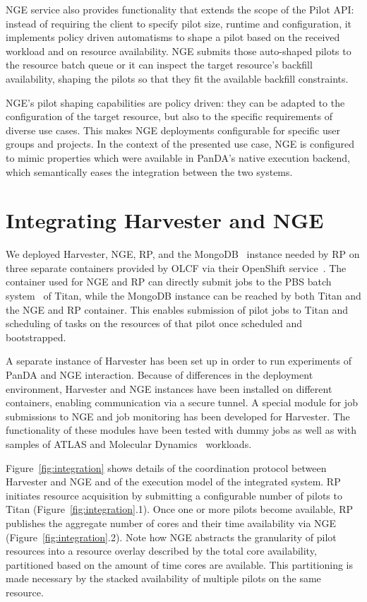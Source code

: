\documentclass{webofc}
\begin{document}
NGE service also provides functionality that extends the scope of the Pilot
API: instead of requiring the client to specify pilot size, runtime and
configuration, it implements policy driven automatisms to shape a pilot based
on the received workload and on resource availability. NGE submits those
auto-shaped pilots to the resource batch queue or it can inspect the target
resource's backfill availability, shaping the pilots so that they fit the
available backfill constraints.
	
NGE's pilot shaping capabilities are policy driven: they can be adapted to
the configuration of the target resource, but also to the specific
requirements of diverse use cases. This makes NGE deployments configurable
for specific user groups and projects. In the context of the presented use
case, NGE is configured to mimic properties which were available in PanDA's
native execution backend, which semantically eases the integration between
the two systems.


\section{Integrating Harvester and NGE}\label{sec:integration}

We deployed Harvester, NGE, RP, and the MongoDB~\cite{chodorow2013mongodb}
instance needed by RP on three separate containers provided by OLCF via their
OpenShift service~\cite{openshift}. The container used for NGE and RP can
directly submit jobs to the PBS batch system~\cite{henderson1995job} of
Titan, while the MongoDB instance can be reached by both Titan and the NGE
and RP container. This enables submission of pilot jobs to Titan and
scheduling of tasks on the resources of that pilot once scheduled and
bootstrapped.

A separate instance of Harvester has been set up in order to run experiments
of PanDA and NGE interaction. Because of differences in the deployment
environment, Harvester and NGE instances have been installed on different
containers, enabling communication via a secure tunnel. A special module for
job submissions to NGE and job monitoring has been developed for Harvester.
The functionality of these modules have been tested with dummy jobs as well
as with samples of ATLAS and Molecular
Dynamics~\cite{3b6dad414e794d36954333f8f177f47c} workloads.

Figure~\ref{fig:integration} shows details of the coordination protocol
between Harvester and NGE and of the execution model of the integrated
system. RP initiates resource acquisition by submitting a configurable number
of pilots to Titan (Figure~\ref{fig:integration}.1). Once one or more pilots
become available, RP publishes the aggregate number of cores and their time
availability via NGE (Figure~\ref{fig:integration}.2). Note how NGE abstracts
the granularity of pilot resources into a resource overlay described by the
total core availability, partitioned based on the amount of time cores are
available. This partitioning is made necessary by the stacked availability of
multiple pilots on the same resource.
\end{document}

